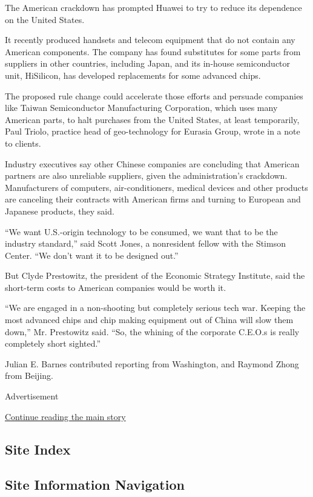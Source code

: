 The American crackdown has prompted Huawei to try to reduce its
dependence on the United States.

It recently produced handsets and telecom equipment that do not contain
any American components. The company has found substitutes for some
parts from suppliers in other countries, including Japan, and its
in-house semiconductor unit, HiSilicon, has developed replacements for
some advanced chips.

The proposed rule change could accelerate those efforts and persuade
companies like Taiwan Semiconductor Manufacturing Corporation, which
uses many American parts, to halt purchases from the United States, at
least temporarily, Paul Triolo, practice head of geo-technology for
Eurasia Group, wrote in a note to clients.

Industry executives say other Chinese companies are concluding that
American partners are also unreliable suppliers, given the
administration's crackdown. Manufacturers of computers,
air-conditioners, medical devices and other products are canceling their
contracts with American firms and turning to European and Japanese
products, they said.

``We want U.S.-origin technology to be consumed, we want that to be the
industry standard,'' said Scott Jones, a nonresident fellow with the
Stimson Center. ``We don't want it to be designed out.''

But Clyde Prestowitz, the president of the Economic Strategy Institute,
said the short-term costs to American companies would be worth it.

``We are engaged in a non-shooting but completely serious tech war.
Keeping the most advanced chips and chip making equipment out of China
will slow them down,'' Mr. Prestowitz said. ``So, the whining of the
corporate C.E.O.s is really completely short sighted.''

Julian E. Barnes contributed reporting from Washington, and Raymond
Zhong from Beijing.

Advertisement

\protect\hyperlink{after-bottom}{Continue reading the main story}

\hypertarget{site-index}{%
\subsection{Site Index}\label{site-index}}

\hypertarget{site-information-navigation}{%
\subsection{Site Information
Navigation}\label{site-information-navigation}}

